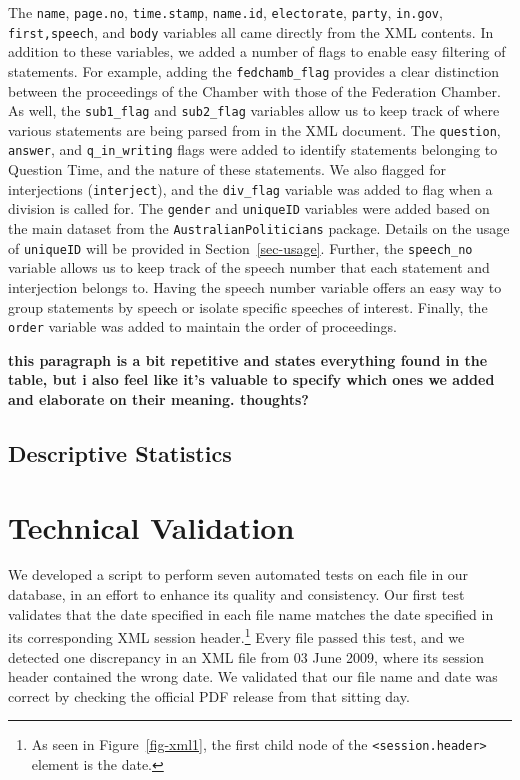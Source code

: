 \documentclass[
  letterpaper,
  DIV=11,
  numbers=noendperiod]{scrartcl}
\begin{document}
The \texttt{name}, \texttt{page.no}, \texttt{time.stamp},
\texttt{name.id}, \texttt{electorate}, \texttt{party}, \texttt{in.gov},
\texttt{first,speech}, and \texttt{body} variables all came directly
from the XML contents. In addition to these variables, we added a number
of flags to enable easy filtering of statements. For example, adding the
\texttt{fedchamb\_flag} provides a clear distinction between the
proceedings of the Chamber with those of the Federation Chamber. As
well, the \texttt{sub1\_flag} and \texttt{sub2\_flag} variables allow us
to keep track of where various statements are being parsed from in the
XML document. The \texttt{question}, \texttt{answer}, and
\texttt{q\_in\_writing} flags were added to identify statements
belonging to Question Time, and the nature of these statements. We also
flagged for interjections (\texttt{interject}), and the
\texttt{div\_flag} variable was added to flag when a division is called
for. The \texttt{gender} and \texttt{uniqueID} variables were added
based on the main dataset from the \texttt{AustralianPoliticians}
package. Details on the usage of \texttt{uniqueID} will be provided in
Section~\ref{sec-usage}. Further, the \texttt{speech\_no} variable
allows us to keep track of the speech number that each statement and
interjection belongs to. Having the speech number variable offers an
easy way to group statements by speech or isolate specific speeches of
interest. Finally, the \texttt{order} variable was added to maintain the
order of proceedings.

\textbf{this paragraph is a bit repetitive and states everything found
in the table, but i also feel like it's valuable to specify which ones
we added and elaborate on their meaning. thoughts?}

\hypertarget{sec-stats}{%
\subsection{Descriptive Statistics}\label{sec-stats}}

\hypertarget{technical-validation}{%
\section{Technical Validation}\label{technical-validation}}

We developed a script to perform seven automated tests on each file in
our database, in an effort to enhance its quality and consistency. Our
first test validates that the date specified in each file name matches
the date specified in its corresponding XML session header.\footnote{As
  seen in Figure~\ref{fig-xml1}, the first child node of the
  \texttt{\textless{}session.header\textgreater{}} element is the date.}
Every file passed this test, and we detected one discrepancy in an XML
file from 03 June 2009, where its session header contained the wrong
date. We validated that our file name and date was correct by checking
the official PDF release from that sitting day.
\end{document}

